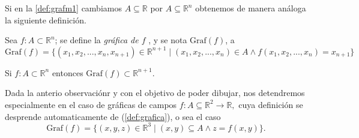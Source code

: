 \begin{obs} Si en la \autoref{def:grafm1} cambiamos  $A \subseteq \mathbb{R}$ por $A \subseteq \mathbb{R}^{n}$  obtenemos de manera an\'aloga la siguiente definici\'on.    
\end{obs}



\begin{definition}  \label{def:grafica}
 
 Sea \( f: A \subset \mathbb{R}^n \); se define la \textit{gráfica de $f$ }, y se nota $\text{Graf}(f)$,  a
 \[
\text{Graf}(f)=\{(x_1,x_2,...,x_n,x_{n+1})\in \mathbb{R}^{n+1} \;|\; (x_1,x_2,...,x_n) \in A \land f(x_1,x_2,...,x_n)=x_{n+1} \}
 \]

\end{definition}
\begin{obs}  Si \( f: A \subset \mathbb{R}^n \) entonces $\text{Graf}(f) \subset \mathbb{R}^{n+1}.$
\end{obs}

\begin{obs}  Dada la  anterio observaci\'onr y con el objetivo de poder dibujar,  nos detendremos especialmente en el caso de gr\'aficas de  campos  $f: A\subseteq \mathbb{R}^2 \rightarrow \mathbb{R},$ cuya definici\'on se desprende automaticamente  de  (\ref{def:grafica}), o sea el caso
 \[
\text{Graf}(f)=\{(x,y,z)\in \mathbb{R}^3 \;|\;(x,y)\subseteq A \land z=f(x,y) \}.
 \]
\end{obs}


